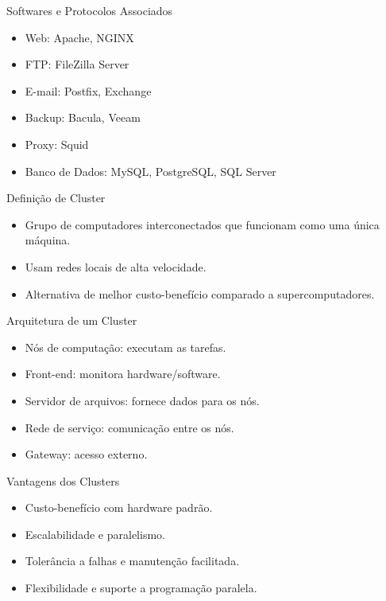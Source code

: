 \documentclass{beamer}
\begin{document}
\begin{frame}{Softwares e Protocolos Associados}
\begin{itemize}
    \item Web: Apache, NGINX
    \item FTP: FileZilla Server
    \item E-mail: Postfix, Exchange
    \item Backup: Bacula, Veeam
    \item Proxy: Squid
    \item Banco de Dados: MySQL, PostgreSQL, SQL Server
\end{itemize}
\end{frame}

\begin{frame}{Definição de Cluster}
\begin{itemize}
    \item Grupo de computadores interconectados que funcionam como uma única máquina.
    \item Usam redes locais de alta velocidade.
    \item Alternativa de melhor custo-benefício comparado a supercomputadores.
\end{itemize}
\end{frame}

\begin{frame}{Arquitetura de um Cluster}
\begin{itemize}
    \item Nós de computação: executam as tarefas.
    \item Front-end: monitora hardware/software.
    \item Servidor de arquivos: fornece dados para os nós.
    \item Rede de serviço: comunicação entre os nós.
    \item Gateway: acesso externo.
\end{itemize}
\end{frame}

\begin{frame}{Vantagens dos Clusters}
\begin{itemize}
    \item Custo-benefício com hardware padrão.
    \item Escalabilidade e paralelismo.
    \item Tolerância a falhas e manutenção facilitada.
    \item Flexibilidade e suporte a programação paralela.
\end{itemize}
\end{frame}
\end{document}
